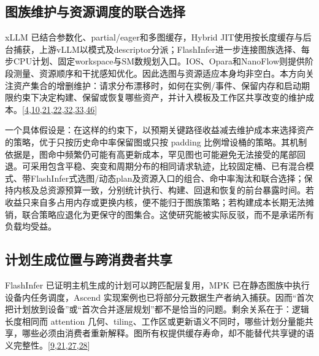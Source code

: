 \documentclass[
  UTF8,
  zihao=5]{ctexart}
\begin{document}
\hypertarget{ux56feux65cfux7ef4ux62a4ux4e0eux8d44ux6e90ux8c03ux5ea6ux7684ux8054ux5408ux9009ux62e9}{%
\subsection*{图族维护与资源调度的联合选择}\label{ux56feux65cfux7ef4ux62a4ux4e0eux8d44ux6e90ux8c03ux5ea6ux7684ux8054ux5408ux9009ux62e9}}

xLLM 已结合参数化、partial/eager和多图缓存，Hybrid
JIT使用按长度缓存与后台捕获，上游vLLM以模式及descriptor分派；FlashInfer进一步连接图族选择、每步CPU计划、固定workspace与SM数规划入口。IOS、Opara和NanoFlow则提供阶段测量、资源顺序和干扰感知优化。因此选图与资源适应本身均非空白。本方向关注资产集合的增删维护：请求分布漂移时，如何在实例/事件、保留内存和启动期限约束下决定构建、保留或恢复哪些资产，并计入模板及工作区共享改变的维护成本。{[}\protect\hyperlink{ref-liu2025xllm}{4},\protect\hyperlink{ref-ding2021ios}{10},\protect\hyperlink{ref-ye2025flashinfer}{21},\protect\hyperlink{ref-yadav2026hybridpreprint}{22},\protect\hyperlink{ref-chen2025opara}{32},\protect\hyperlink{ref-zhu2025nanoflow}{33},\protect\hyperlink{ref-vllmcudagraphdesign}{46}{]}

一个具体假设是：在这样的约束下，以预期关键路径收益减去维护成本来选择资产的策略，优于只按历史命中率保留图或只按
padding
比例增设桶的策略。其机制依据是，图命中频繁仍可能有高更新成本，罕见图也可能避免无法接受的尾部回退。可采用包含平稳、突变和周期分布的相同请求轨迹，比较固定桶、已有混合模式、带FlashInfer式选图/动态plan及资源入口的组合、命中率淘汰和联合选择；保持内核及总资源预算一致，分别统计执行、构建、回退和恢复的前台暴露时间。若收益只来自多占用内存或更换内核，便不能归于图族策略；若构建成本长期无法摊销，联合策略应退化为更保守的图集合。这使研究能被实际反驳，而不是承诺所有负载均受益。

\hypertarget{ux8ba1ux5212ux751fux6210ux4f4dux7f6eux4e0eux8de8ux6d88ux8d39ux8005ux5171ux4eab}{%
\subsection*{计划生成位置与跨消费者共享}\label{ux8ba1ux5212ux751fux6210ux4f4dux7f6eux4e0eux8de8ux6d88ux8d39ux8005ux5171ux4eab}}

FlashInfer 已证明主机生成的计划可以跨匹配层复用，MPK
已在静态图族中执行设备内任务调度，Ascend
实现案例也已将部分元数据生产者纳入捕获。因而``首次把计划放到设备''或``首次合并逐层规划''都不是恰当的问题。剩余关系在于：逻辑长度相同而
attention
几何、tiling、工作区或更新语义不同时，哪些计划分量能共享，哪些必须由消费者重新解释。图所有权提供缓存寿命，却不能替代共享键的语义完整性。{[}\protect\hyperlink{ref-vllmascendpr21259}{9},\protect\hyperlink{ref-ye2025flashinfer}{21},\protect\hyperlink{ref-vllmascendpr21281}{27},\protect\hyperlink{ref-cheng2026mpk}{28}{]}
\end{document}
